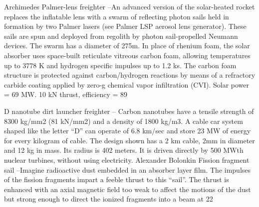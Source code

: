 \documentclass[a4paper]{book}
\begin{document}
Archimedes Palmer-lens freighter –An advanced version of the solar-heated rocket replaces the inflatable lens with a swarm of reflecting photon sails held in formation by two Palmer lasers (see Palmer LSP aerosol lens generator). These sails are spun and deployed from regolith by photon sail-propelled Neumann devices. The swarm has a diameter of 275m. In place of rhenium foam, the solar absorber uses space-built reticulate vitreous carbon foam, allowing temperatures up to 3778 K and hydrogen specific impulses up to 1.2 ks. The carbon foam structure is protected against carbon/hydrogen reactions by means of a refractory carbide coating applied by zero-g chemical vapor infiltration (CVI). Solar power = 69 MW. 10 kN thrust, efficiency = 89%
 
D nanotube dirt launcher freighter – Carbon nanotubes have a tensile strength of 8300 kg/mm2 (81 kN/mm2) and a density of 1800 kg/m3. A cable car system shaped like the letter “D” can operate of 6.8 km/sec and store 23 MW of energy for every kilogram of cable. The design shown has a 2 km cable, 2mm in diameter and 12 kg in mass. Its radius is 402 meters. It is driven directly by 500 MWth nuclear turbines, without using electricity. Alexander Bolonkin
Fission fragment sail –Imagine radioactive dust embedded in an absorber layer film. The impulses of the fission fragments impart a feeble thrust to this “sail”. The thrust is enhanced with an axial magnetic field too weak to affect the motions of the dust but strong enough to direct the ionized fragments into a beam at 22%
 
\end{document}
